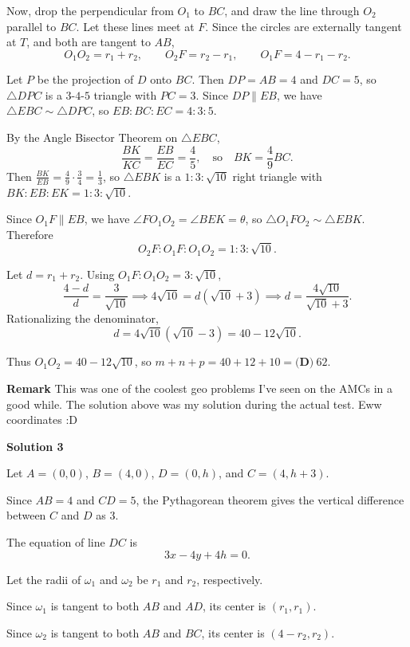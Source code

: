 \begin{enumerate}
 Now, drop the perpendicular from $O_1$ to $BC$, and draw the line through $O_2$ parallel to $BC$. Let these lines meet at $F$. Since the circles are externally tangent at $T$, and both are tangent to $AB$,
 \[O_1O_2 = r_1 + r_2, \qquad O_2F = r_2 - r_1, \qquad O_1F = 4 - r_1 - r_2.\]

 Let $P$ be the projection of $D$ onto $BC$. Then $DP = AB = 4$ and $DC = 5$, so $\triangle DPC$ is a $3$-$4$-$5$ triangle with $PC = 3$. Since $DP \parallel EB$, we have $\triangle EBC \sim \triangle DPC$, so $EB : BC : EC = 4 : 3 : 5$.

 By the Angle Bisector Theorem on $\triangle EBC$,
 \[\frac{BK}{KC} = \frac{EB}{EC} = \frac{4}{5}, \quad\text{so}\quad BK = \frac{4}{9}BC.\]Then $\frac{BK}{EB} = \frac{4}{9}\cdot\frac{3}{4} = \frac{1}{3}$, so $\triangle EBK$ is a $1 : 3 : \sqrt{10}$ right triangle with $BK : EB : EK = 1 : 3 : \sqrt{10}$.

 Since $O_1F \parallel EB$, we have $\angle FO_1O_2 = \angle BEK = \theta$, so $\triangle O_1FO_2 \sim \triangle EBK$. Therefore
 \[O_2F : O_1F : O_1O_2 = 1 : 3 : \sqrt{10}.\]

 Let $d = r_1 + r_2$. Using $O_1F : O_1O_2 = 3 : \sqrt{10}$,
 \[\frac{4 - d}{d} = \frac{3}{\sqrt{10}} \implies 4\sqrt{10} = d\left(\sqrt{10} + 3\right) \implies d = \frac{4\sqrt{10}}{\sqrt{10} + 3}.\]Rationalizing the denominator,
 \[d = 4\sqrt{10}\left(\sqrt{10} - 3\right) = 40 - 12\sqrt{10}.\]

 Thus $O_1O_2 = 40 - 12\sqrt{10}$, so $m + n + p = 40 + 12 + 10 = \boxed{\textbf{(D)}~62}$.

 \textbf{Remark} This was one of the coolest geo problems I've seen on the AMCs in a good while. The solution above was my solution during the actual test. Eww coordinates :D

 



\textbf{Solution 3}

Let $A=(0,0)$, $B=(4,0)$, $D=(0,h)$, and $C=(4,h+3)$.

 Since $AB=4$ and $CD=5$, the Pythagorean theorem gives the vertical difference between $C$ and $D$ as $3$.

 The equation of line $DC$ is
 \[3x-4y+4h=0.\]

 Let the radii of $\omega_1$ and $\omega_2$ be $r_1$ and $r_2$, respectively.

 Since $\omega_1$ is tangent to both $AB$ and $AD$, its center is $(r_1,r_1)$.

 Since $\omega_2$ is tangent to both $AB$ and $BC$, its center is $(4-r_2,r_2)$.


\end{enumerate}
